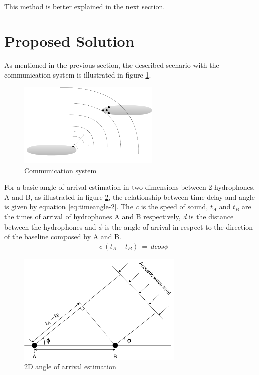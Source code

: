 This method is better explained in the next section.


\section{Proposed Solution}

As mentioned in the previous section, the described scenario with the communication system is illustrated in figure \ref{fig:auv_scene}. 
\begin{figure}[!htbp]
	\centering
	\includegraphics[width=0.6\textwidth]{figures/proposed-solution}
	\caption{Communication system}
	\label{fig:auv_scene}
\end{figure}

For a basic angle of arrival estimation in two dimensions between 2 hydrophones, A and B, as illustrated in figure \ref{fig:anglegeo}, the relationship between time delay and angle is given by equation \ref{eq:timeangle-2}. The \textit{c} is the speed of sound, \textit{$t_{A}$} and \textit{$t_{B}$} are the times of arrival of hydrophones A and B respectively, \textit{d} is the distance between the hydrophones and \textit{$\phi$} is the angle of arrival in respect to the direction of the baseline composed by A and B. 
\begin{eqnarray}
&c\ (t_{A} - t_{B})\ =\ dcos\phi
\label{eq:timeangle-2}
\end{eqnarray}
\begin{figure}[!htbp]
	\centering
	\includegraphics[width=0.7\textwidth]{figures/geohydro}
	\caption{2D angle of arrival estimation}
	\label{fig:anglegeo}
\end{figure}

